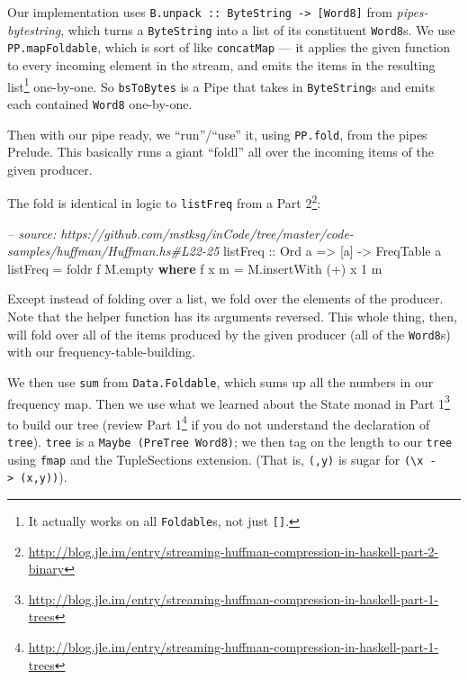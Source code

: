 \documentclass[]{article}
\newenvironment{Shaded}{}{}
\newcommand{\KeywordTok}[1]{\textcolor[rgb]{0.00,0.44,0.13}{\textbf{{#1}}}}
\newcommand{\DataTypeTok}[1]{\textcolor[rgb]{0.56,0.13,0.00}{{#1}}}
\newcommand{\DecValTok}[1]{\textcolor[rgb]{0.25,0.63,0.44}{{#1}}}
\newcommand{\CommentTok}[1]{\textcolor[rgb]{0.38,0.63,0.69}{\textit{{#1}}}}
\newcommand{\OtherTok}[1]{\textcolor[rgb]{0.00,0.44,0.13}{{#1}}}
\newcommand{\FunctionTok}[1]{\textcolor[rgb]{0.02,0.16,0.49}{{#1}}}
\newcommand{\NormalTok}[1]{{#1}}
\renewcommand{\href}[2]{#2\footnote{\url{#1}}}
\begin{document}
Our implementation uses
\texttt{B.unpack\ ::\ ByteString\ -\textgreater{}\ {[}Word8{]}} from
\emph{pipes-bytestring}, which turns a \texttt{ByteString} into a list
of its constituent \texttt{Word8}s. We use \texttt{PP.mapFoldable},
which is sort of like \texttt{concatMap} --- it applies the given
function to every incoming element in the stream, and emits the items in
the resulting list\footnote{It actually works on all \texttt{Foldable}s,
  not just \texttt{{[}{]}}.} one-by-one. So \texttt{bsToBytes} is a Pipe
that takes in \texttt{ByteString}s and emits each contained
\texttt{Word8} one-by-one.

Then with our pipe ready, we ``run''/``use'' it, using \texttt{PP.fold},
from the pipes Prelude. This basically runs a giant ``foldl'' all over
the incoming items of the given producer.

The fold is identical in logic to \texttt{listFreq} from a
\href{http://blog.jle.im/entry/streaming-huffman-compression-in-haskell-part-2-binary}{Part
2}:

\begin{Shaded}
\begin{Highlighting}[]
\CommentTok{-- source: https://github.com/mstksg/inCode/tree/master/code-samples/huffman/Huffman.hs#L22-25}
\OtherTok{listFreq ::} \DataTypeTok{Ord} \NormalTok{a }\OtherTok{=>} \NormalTok{[a] }\OtherTok{->} \DataTypeTok{FreqTable} \NormalTok{a}
\NormalTok{listFreq }\FunctionTok{=} \NormalTok{foldr f M.empty}
  \KeywordTok{where}
    \NormalTok{f x m }\FunctionTok{=} \NormalTok{M.insertWith (}\FunctionTok{+}\NormalTok{) x }\DecValTok{1} \NormalTok{m}
\end{Highlighting}
\end{Shaded}

Except instead of folding over a list, we fold over the elements of the
producer. Note that the helper function has its arguments reversed. This
whole thing, then, will fold over all of the items produced by the given
producer (all of the \texttt{Word8}s) with our frequency-table-building.

We then use \texttt{sum} from \texttt{Data.Foldable}, which sums up all
the numbers in our frequency map. Then we use what we learned about the
State monad in
\href{http://blog.jle.im/entry/streaming-huffman-compression-in-haskell-part-1-trees}{Part
1} to build our tree (review
\href{http://blog.jle.im/entry/streaming-huffman-compression-in-haskell-part-1-trees}{Part
1} if you do not understand the declaration of \texttt{tree}).
\texttt{tree} is a \texttt{Maybe\ (PreTree\ Word8)}; we then tag on the
length to our \texttt{tree} using \texttt{fmap} and the TupleSections
extension. (That is, \texttt{(,y)} is sugar for
\texttt{(\textbackslash{}x\ -\textgreater{}\ (x,y))}).
\end{document}
